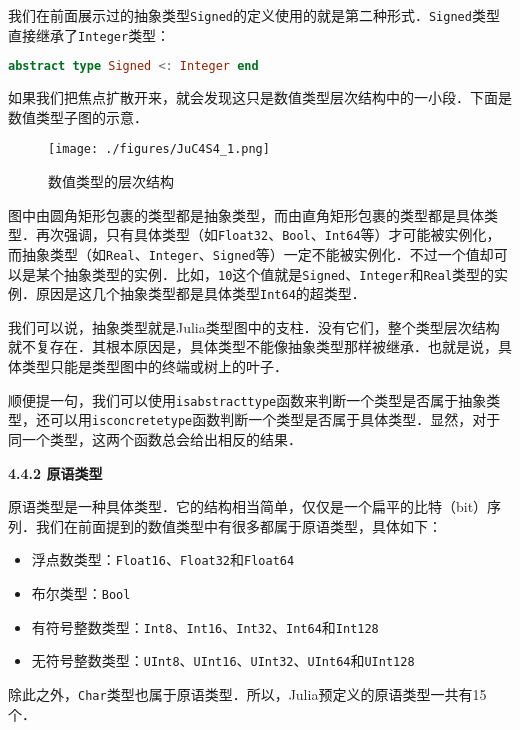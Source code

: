 我们在前面展示过的抽象类型\verb|Signed|的定义使用的就是第二种形式．\verb|Signed|类型直接继承了\verb|Integer|类型：

\begin{lstlisting}[language=julia]
abstract type Signed <: Integer end
\end{lstlisting}

如果我们把焦点扩散开来，就会发现这只是数值类型层次结构中的一小段．下面是数值类型子图的示意．

\begin{figure}[ht]
\centering
\texttt{[image: ./figures/JuC4S4\_1.png]}
\caption{数值类型的层次结构} \label{JuC4S4_fig1}
\end{figure}

图中由圆角矩形包裹的类型都是抽象类型，而由直角矩形包裹的类型都是具体类型．再次强调，只有具体类型（如\verb|Float32|、\verb|Bool|、\verb|Int64|等）才可能被实例化，而抽象类型（如\verb|Real|、\verb|Integer|、\verb|Signed|等）一定不能被实例化．不过一个值却可以是某个抽象类型的实例．比如，\verb|10|这个值就是\verb|Signed|、\verb|Integer|和\verb|Real|类型的实例．原因是这几个抽象类型都是具体类型\verb|Int64|的超类型．

我们可以说，抽象类型就是Julia类型图中的支柱．没有它们，整个类型层次结构就不复存在．其根本原因是，具体类型不能像抽象类型那样被继承．也就是说，具体类型只能是类型图中的终端或树上的叶子．

顺便提一句，我们可以使用\verb|isabstracttype|函数来判断一个类型是否属于抽象类型，还可以用\verb|isconcretetype|函数判断一个类型是否属于具体类型．显然，对于同一个类型，这两个函数总会给出相反的结果．

\textbf{4.4.2 原语类型}

原语类型是一种具体类型．它的结构相当简单，仅仅是一个扁平的比特（bit）序列．我们在前面提到的数值类型中有很多都属于原语类型，具体如下：

\begin{itemize}
\item 浮点数类型：\verb|Float16|、\verb|Float32|和\verb|Float64|
\item 布尔类型：\verb|Bool|
\item 有符号整数类型：\verb|Int8|、\verb|Int16|、\verb|Int32|、\verb|Int64|和\verb|Int128|
\item 无符号整数类型：\verb|UInt8|、\verb|UInt16|、\verb|UInt32|、\verb|UInt64|和\verb|UInt128|
\end{itemize}

除此之外，\verb|Char|类型也属于原语类型．所以，Julia预定义的原语类型一共有15个．

